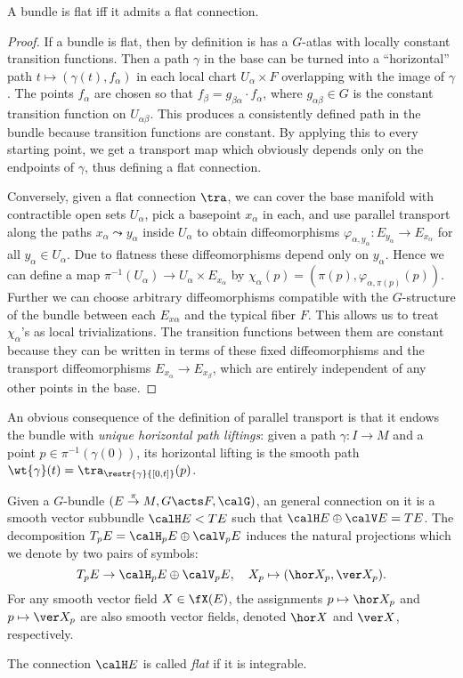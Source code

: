 \begin{prop}
    A bundle is flat iff it admits a flat connection.
\end{prop}
\begin{proof}
    If a bundle is flat, then by definition is has a $G$-atlas with locally constant transition functions. Then a path $\gamma$ in the base can be turned into a ``horizontal'' path $t\mapsto (\gamma(t),f_\alpha)$ in each local chart $U_\alpha\times F$ overlapping with the image of $\gamma$. The points $f_\alpha$ are chosen so that $f_\beta=g_{\beta\alpha}\cdot f_\alpha$, where $g_{\alpha\beta}\in G$ is the constant transition function on $U_{\alpha\beta}$. This produces a consistently defined path in the bundle because transition functions are constant. By applying this to every starting point, we get a transport map which obviously depends only on the endpoints of $\gamma$, thus defining a flat connection.

    Conversely, given a flat connection $\tra$, we can cover the base manifold with contractible open sets $U_\alpha$, pick a basepoint $x_\alpha$ in each, and use parallel transport along the paths $x_\alpha\leadsto y_\alpha$ inside $U_\alpha$ to obtain diffeomorphisms $\varphi_{\alpha,y_\alpha}:E_{y_\alpha}\to E_{x_\alpha}$ for all $y_\alpha\in U_\alpha$. Due to flatness these diffeomorphisms depend only on $y_\alpha$. Hence we can define a map $\pi^{-1}(U_\alpha)\to U_\alpha\times E_{x_\alpha}$ by $\chi_\alpha(p)=(\pi(p),\varphi_{\alpha,\pi(p)}(p))$. Further we can choose arbitrary diffeomorphisms compatible with the $G$-structure of the bundle between each $E_{x\alpha}$ and the typical fiber $F$. This allows us to treat $\chi_\alpha$'s as local trivializations. The transition functions between them are constant because they can be written in terms of these fixed diffeomorphisms and the transport diffeomorphisms $E_{x_\alpha}\to E_{x_\beta}$, which are entirely independent of any other points in the base.
\end{proof}

An obvious consequence of the definition of parallel transport is that it endows the bundle with \emph{unique horizontal path liftings}: given a path $\gamma:I\to M$ and a point $p\in\pi^{-1}(\gamma(0))$, its horizontal lifting is the smooth path $\wt{\gamma}(t)=\tra_{\restr{\gamma}{[0,t]}}(p)$.


\begin{defn}
    Given a $G$-bundle $(E\overset{\pi}{\to}M,G\acts F,\calG)$, an general connection on it is a smooth vector subbundle $\calH E<TE$ such that $\calH E\oplus \calV E=TE$. The decomposition $T_pE=\calH_pE\oplus \calV_pE$ induces the natural projections which we denote by two pairs of symbols:
    \[T_pE\to \calH_pE\oplus \calV_pE,\quad X_p\mapsto (\hor X_p,\ver X_p).\]
    For any smooth vector field $X\in\fX(E)$, the assignments $p\mapsto \hor X_p$ and $p\mapsto \ver X_p$ are also smooth vector fields, denoted $\hor X$ and $\ver X$, respectively.

    The connection $\calH E$ is called \emph{flat} if it is integrable.
\end{defn}


